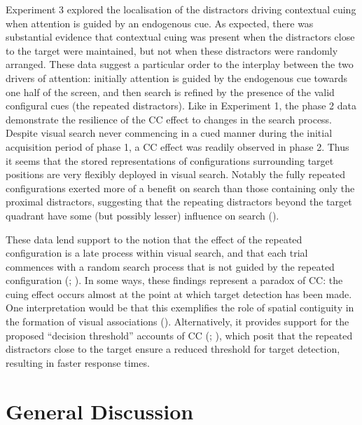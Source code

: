 \documentclass[
  man,
  floatsintext,
  longtable,
  nolmodern,
  notxfonts,
  notimes,
  colorlinks=true,linkcolor=blue,citecolor=blue,urlcolor=blue]{apa7}
\begin{document}
Experiment 3 explored the localisation of the distractors driving
contextual cuing when attention is guided by an endogenous cue. As
expected, there was substantial evidence that contextual cuing was
present when the distractors close to the target were maintained, but
not when these distractors were randomly arranged. These data suggest a
particular order to the interplay between the two drivers of attention:
initially attention is guided by the endogenous cue towards one half of
the screen, and then search is refined by the presence of the valid
configural cues (the repeated distractors). Like in Experiment 1, the
phase 2 data demonstrate the resilience of the CC effect to changes in
the search process. Despite visual search never commencing in a cued
manner during the initial acquisition period of phase 1, a CC effect was
readily observed in phase 2. Thus it seems that the stored
representations of configurations surrounding target positions are very
flexibly deployed in visual search. Notably the fully repeated
configurations exerted more of a benefit on search than those containing
only the proximal distractors, suggesting that the repeating distractors
beyond the target quadrant have some (but possibly lesser) influence on
search ().

These data lend support to the notion that the effect of the repeated
configuration is a late process within visual search, and that each
trial commences with a random search process that is not guided by the
repeated configuration (; ). In some ways, these
findings represent a paradox of CC: the cuing effect occurs almost at
the point at which target detection has been made. One interpretation
would be that this exemplifies the role of spatial contiguity in the
formation of visual associations (). Alternatively, it provides support for the proposed
``decision threshold'' accounts of CC (; ), which posit
that the repeated distractors close to the target ensure a reduced
threshold for target detection, resulting in faster response times.

\section{General Discussion}\label{general-discussion}
\end{document}

